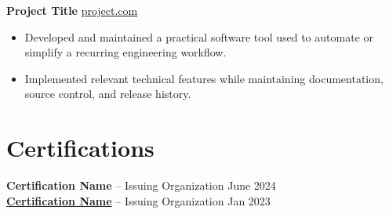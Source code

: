 \documentclass[11pt]{article}
\begin{document}
\textbf{Project Title}
\hfill
\href{https://project.com}{project.com} \\

\vspace{-9pt}

\begin{itemize}
  \item Developed and maintained a practical software tool used to automate or simplify a recurring engineering workflow.
  \item Implemented relevant technical features while maintaining documentation, source control, and release history.
\end{itemize}

\vspace{-18.5pt}

%
%
%
%
\section*{Certifications}

\textbf{Certification Name} -- Issuing Organization
\hfill June 2024 \\

\textbf{\href{https://credential.example.com}{Certification Name}}
-- Issuing Organization
\hfill Jan 2023

\vspace{-6.5pt}

%
%
%
\end{document}
